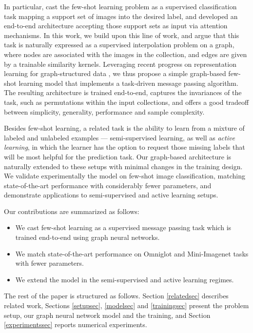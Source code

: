 \documentclass{article} \usepackage{iclr2018_conference,times}
\begin{document}
In particular, \cite{vinyals2016matching} cast the few-shot learning problem 
as a supervised classification task mapping a support set of images 
into the desired label, and developed an end-to-end architecture 
accepting those support sets as input via attention mechanisms. 
In this work, we build upon this line of work, and 
 argue that this task is naturally expressed as a 
supervised interpolation problem on a graph, 
where nodes are associated 
with the images in the collection, and edges are given by a trainable similarity 
kernels. Leveraging recent progress on representation learning for 
graph-structured data \cite{bronstein2017geometric,gilmer2017neural}, we thus propose a simple 
graph-based few-shot learning model
that implements a task-driven message passing algorithm.
The resulting architecture is trained end-to-end, captures the 
invariances of the task, such as permutations within the input collections, 
and offers a good tradeoff between simplicity, generality, 
performance and sample complexity. 

Besides few-shot learning, a related task is the ability to learn from a mixture of
labeled and unlabeled examples --- semi-supervised learning, as well 
as \emph{active learning}, in which the learner has the option to request those missing labels
that will be most helpful for the prediction task. 
Our graph-based architecture is naturally extended to these setups with 
minimal changes in the training design. 
We validate experimentally the model on few-shot image classification, matching 
state-of-the-art performance with considerably fewer parameters,
and demonstrate applications to semi-supervised and active learning setups. 



Our contributions are summarized as follows:
\begin{itemize}
    \item We cast few-shot learning as a supervised message passing task which is trained end-to-end using graph neural networks.
    \item We match state-of-the-art performance on Omniglot and Mini-Imagenet tasks with fewer parameters. 
    \item We extend the model in the semi-supervised and active learning regimes. 
\end{itemize}

The rest of the paper is structured as follows. Section \ref{relatedsec} describes related work, 
Sections \ref{setupsec}, \ref{modelsec} and \ref{trainingsec} present the problem setup, our graph neural network model and 
the training, and Section \ref{experimentssec} reports numerical experiments. 
\end{document}
